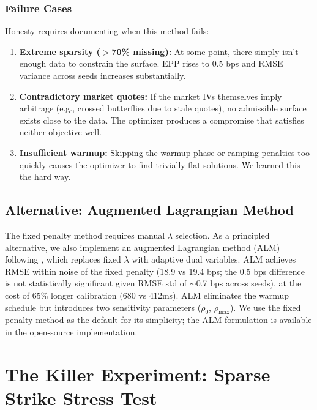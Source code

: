 \documentclass[11pt,a4paper]{article}
\begin{document}
\subsubsection{Failure Cases}

Honesty requires documenting when this method fails:

\begin{enumerate}
    \item \textbf{Extreme sparsity ($>$70\% missing):} At some point, there simply isn't enough data to constrain the surface. EPP rises to 0.5 bps and RMSE variance across seeds increases substantially.
    
    \item \textbf{Contradictory market quotes:} If the market IVs themselves imply arbitrage (e.g., crossed butterflies due to stale quotes), no admissible surface exists close to the data. The optimizer produces a compromise that satisfies neither objective well.
    
    \item \textbf{Insufficient warmup:} Skipping the warmup phase or ramping penalties too quickly causes the optimizer to find trivially flat solutions. We learned this the hard way.
\end{enumerate}

\subsection{Alternative: Augmented Lagrangian Method}
\label{sec:alm}

The fixed penalty method requires manual $\lambda$ selection. As a principled alternative, we also implement an augmented Lagrangian method (ALM) following \citet{basir2023}, which replaces fixed $\lambda$ with adaptive dual variables. ALM achieves RMSE within noise of the fixed penalty (18.9 vs 19.4 bps; the 0.5 bps difference is not statistically significant given RMSE std of ${\sim}$0.7 bps across seeds), at the cost of 65\% longer calibration (680 vs 412ms). ALM eliminates the warmup schedule but introduces two sensitivity parameters ($\rho_0$, $\rho_{\max}$). We use the fixed penalty method as the default for its simplicity; the ALM formulation is available in the open-source implementation.

\section{The Killer Experiment: Sparse Strike Stress Test}
\label{sec:sparse}
\end{document}
